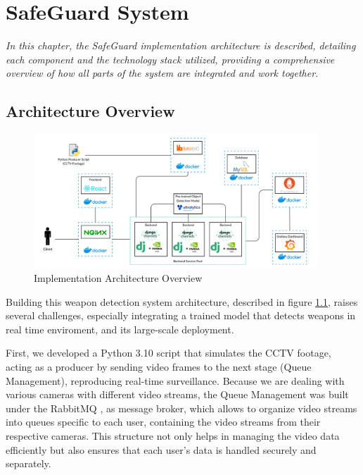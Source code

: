 \chapter{SafeGuard System}
\label{chapter:implementation}

\newenvironment{implementation}
{\quote\itshape}
{\endquote}

\begin{implementation}
    In this chapter, the SafeGuard implementation architecture is described, detailing each component and the 
    technology stack utilized, providing a comprehensive overview of how all parts of the system are 
    integrated and work together.
\end{implementation}

\section{Architecture Overview}
\begin{figure}[h]
    \centering 
    \includegraphics[width=0.95\textwidth]{figs/implementation-architecture6.png} 
    \caption{Implementation Architecture Overview}
    \label{fig:implementation-arch}
\end{figure}
Building this weapon detection system architecture, described in figure \ref{fig:implementation-arch},
 raises several challenges, 
especially integrating a trained model that detects weapons in real time enviroment,
and its large-scale deployment.

First, we developed a Python 3.10 script that simulates the CCTV footage, acting as a producer by sending video 
frames to the next stage (Queue Management), reproducing real-time surveillance.
Because we are dealing with various cameras with different video streams, the Queue Management was built under 
the RabbitMQ \cite{rfc48}, as message broker, which allows to organize video streams into queues
specific to each user, containing the video streams from their respective cameras. This
structure not only helps in managing the video data efficiently but also ensures that each
user's data is handled securely and separately.

